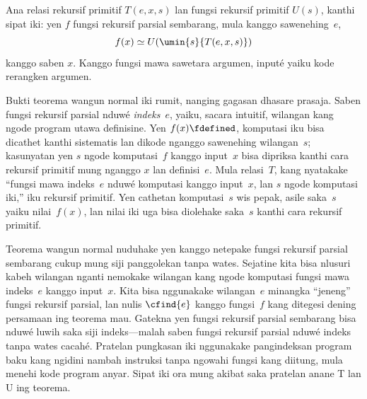 \documentclass[../../../include/open-logic-section]{subfiles}
\begin{document}

\begin{thm}
Ana relasi rekursif primitif $T(e, x, s)$ lan
fungsi rekursif primitif $U(s)$, kanthi sipat iki:
yen $f$ fungsi rekursif parsial sembarang,
mula kanggo sawenehing~$e$,
\[
f(x) \simeq U(\umin{s}{T(e, x, s)})
\]
kanggo saben $x$. Kanggo fungsi mawa sawetara argumen, inputé yaiku kode rerangken argumen.
\end{thm}

\begin{explain}
Bukti teorema wangun normal iki rumit,
nanging gagasan dhasare prasaja. Saben
fungsi rekursif parsial nduwé \emph{indeks}~$e$,
yaiku, sacara intuitif, wilangan kang ngode
program utawa definisine. Yen $f(x)
\fdefined$, komputasi iku bisa dicathet
kanthi sistematis lan dikode nganggo
sawenehing wilangan~$s$; kasunyatan yen $s$
ngode komputasi~$f$ kanggo input~$x$
bisa dipriksa kanthi cara rekursif primitif
mung nganggo $x$ lan definisi~$e$.
Mula relasi~$T$, kang nyatakake ``fungsi
mawa indeks~$e$ nduwé komputasi kanggo
input~$x$, lan $s$ ngode komputasi iki,''
iku rekursif primitif. Yen cathetan
komputasi~$s$ wis pepak, asile
saka~$s$ yaiku nilai~$f(x)$, lan
nilai iki uga bisa diolehake saka~$s$
kanthi cara rekursif primitif.

Teorema wangun normal nuduhake yen
kanggo netepake fungsi rekursif parsial
sembarang cukup mung siji panggolekan
tanpa wates. Sejatine kita bisa nlusuri
kabeh wilangan nganti nemokake wilangan
kang ngode komputasi fungsi mawa indeks~$e$
kanggo input~$x$. Kita bisa nggunakake
wilangan~$e$ minangka ``jeneng'' fungsi
rekursif parsial, lan nulis $\cfind{e}$
kanggo fungsi~$f$ kang ditegesi dening
persamaan ing teorema mau. Gatekna yen
fungsi rekursif parsial sembarang bisa
nduwé luwih saka siji indeks---malah
saben fungsi rekursif parsial nduwé
indeks tanpa wates cacahé. Pratelan pungkasan iki nggunakake pangindeksan program baku kang ngidini nambah instruksi tanpa ngowahi fungsi kang diitung, mula menehi kode program anyar. Sipat iki ora mung akibat saka pratelan anane T lan U ing teorema.
\end{explain}
\end{document}
